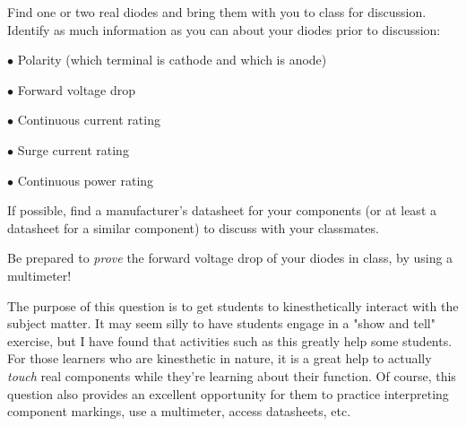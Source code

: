 

Find one or two real diodes and bring them with you to class for discussion.  Identify as much information as you can about your diodes prior to discussion:

\medskip
\item{$\bullet$} Polarity (which terminal is cathode and which is anode)
\item{$\bullet$} Forward voltage drop
\item{$\bullet$} Continuous current rating
\item{$\bullet$} Surge current rating
\item{$\bullet$} Continuous power rating
\medskip







If possible, find a manufacturer's datasheet for your components (or at least a datasheet for a similar component) to discuss with your classmates.

Be prepared to {\it prove} the forward voltage drop of your diodes in class, by using a multimeter!







The purpose of this question is to get students to kinesthetically interact with the subject matter.  It may seem silly to have students engage in a "show and tell" exercise, but I have found that activities such as this greatly help some students.  For those learners who are kinesthetic in nature, it is a great help to actually {\it touch} real components while they're learning about their function.  Of course, this question also provides an excellent opportunity for them to practice interpreting component markings, use a multimeter, access datasheets, etc.




